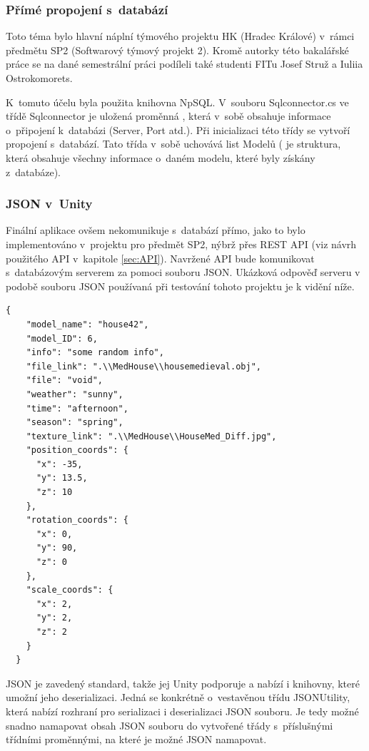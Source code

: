 \documentclass[thesis=B,czech]{FITthesis}[2012/06/26]
\begin{document}
\subsubsection{Přímé propojení s~databází}
 Toto téma bylo hlavní náplní týmového projektu HK (Hradec Králové) v~rámci předmětu SP2 (Softwarový týmový projekt 2). Kromě autorky této bakalářské práce se na dané semestrální práci podíleli také studenti FITu Josef Struž a Iuliia Ostrokomorets. 
   
    K~tomuto účelu byla použita knihovna NpSQL. V~souboru Sqlconnector.cs ve třídě Sqlconnector je uložená proměnná , která v~sobě obsahuje informace o~připojení k~databázi (Server, Port atd.). Při inicializaci této třídy se vytvoří propojení s~databází. Tato třída v~sobě uchovává list Modelů ( je struktura, která obsahuje všechny informace o~daném modelu, které byly získány z~databáze). 
    
    \subsubsection{JSON v~Unity}
	
	Finální aplikace ovšem nekomunikuje s~databází přímo, jako to bylo implementováno v~projektu pro předmět SP2, nýbrž přes REST API (viz návrh použitého API v~kapitole \ref{sec:API}). Navržené API bude komunikovat s~databázovým serverem za pomoci souboru JSON. Ukázková odpověď serveru v podobě souboru JSON používaná při testování tohoto projektu je k vidění níže.
	\begin{lstlisting}[frame=single]
	{
    "model_name": "house42",
    "model_ID": 6,
    "info": "some random info",
    "file_link": ".\\MedHouse\\housemedieval.obj",
    "file": "void",
    "weather": "sunny",
    "time": "afternoon",
    "season": "spring",
    "texture_link": ".\\MedHouse\\HouseMed_Diff.jpg",
    "position_coords": {
      "x": -35,
      "y": 13.5,
      "z": 10
    },
    "rotation_coords": {
      "x": 0,
      "y": 90,
      "z": 0
    },
    "scale_coords": {
      "x": 2,
      "y": 2,
      "z": 2
    }
  }

\end{lstlisting}
	
	 JSON je zavedený standard, takže jej Unity podporuje a nabízí i knihovny, které umožní jeho deserializaci. Jedná se konkrétně o~vestavěnou třídu JSONUtility, která nabízí rozhraní pro serializaci i deserializaci JSON souboru. Je tedy možné snadno namapovat obsah JSON souboru do vytvořené třády s~příslušnými třídními proměnnými, na které je možné JSON namapovat. \cite{UnityJSON}
\end{document}
